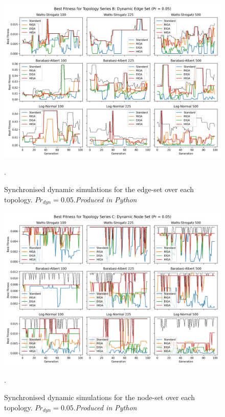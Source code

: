 \documentclass[
	a4paper, %
	10pt, %
	unnumberedsections, %
	twoside, %
]{LTJournalArticle}
\begin{document}
 \begin{figure}
	\includegraphics[width=\linewidth]{Figures/sims/dynamic/series_b_edge_sync.jpg}
	\caption{Synchronised dynamic simulations for the edge-set over each topology. \(Pr_{dyn} = 0.05\).\emph{Produced in Python}}. 
	\label{fig:dynamic_8}
\end{figure}

 \begin{figure}
	\includegraphics[width=\linewidth]{Figures/sims/dynamic/series_c_node_sync.jpg}
	\caption{Synchronised dynamic simulations for the node-set over each topology. \(Pr_{dyn} = 0.05\).\emph{Produced in Python}}. 
	\label{fig:dynamic_9}
\end{figure}
\end{document}
